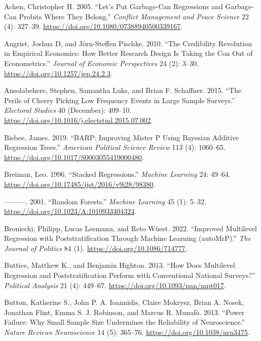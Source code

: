 \documentclass[
]{article}
\newlength{\cslhangindent}
\newlength{\cslentryspacingunit} %
\newenvironment{CSLReferences}[2] %
 {%
  \setlength{\parindent}{0pt}
  \ifodd #1
  \let\oldpar\par
  \def\par{\hangindent=\cslhangindent\oldpar}
  \fi
  \setlength{\parskip}{#2\cslentryspacingunit}
 }%
 {}
\begin{document}
\hypertarget{refs}{}
\begin{CSLReferences}{1}{0}
\leavevmode{}%
Achen, Christopher H. 2005. {``Let's Put Garbage-Can Regressions and
Garbage-Can Probits Where They Belong.''} \emph{Conflict Management and
Peace Science} 22 (4): 327--39.
\url{https://doi.org/10.1080/07388940500339167}.

\leavevmode{}%
Angrist, Joshua D, and Jörn-Steffen Pischke. 2010. {``The Credibility
Revolution in Empirical Economics: How Better Research Design Is Taking
the Con Out of Econometrics.''} \emph{Journal of Economic Perspectives}
24 (2): 3--30. \url{https://doi.org/10.1257/jep.24.2.3}.

\leavevmode{}%
Ansolabehere, Stephen, Samantha Luks, and Brian F. Schaffner. 2015.
{``The Perils of Cherry Picking Low Frequency Events in Large Sample
Surveys.''} \emph{Electoral Studies} 40 (December): 409--10.
\url{https://doi.org/10.1016/j.electstud.2015.07.002}.

\leavevmode{}%
Bisbee, James. 2019. {``BARP: Improving Mister P Using Bayesian Additive
Regression Trees.''} \emph{American Political Science Review} 113 (4):
1060--65. \url{https://doi.org/10.1017/S0003055419000480}.

\leavevmode{}%
Breiman, Leo. 1996. {``Stacked Regressions.''} \emph{Machine Learning}
24: 49--64. \url{https://doi.org/10.17485/ijst/2016/v9i28/98380}.

\leavevmode{}%
---------. 2001. {``Random Forests.''} \emph{Machine Learning} 45 (1):
5--32. \url{https://doi.org/10.1023/A:1010933404324}.

\leavevmode{}%
Broniecki, Philipp, Lucas Leemann, and Reto Wüest. 2022. {``Improved
Multilevel Regression with Poststratification Through Machine Learning
(autoMrP).''} \emph{The Journal of Politics} 84 (1).
\url{https://doi.org/10.1086/714777}.

\leavevmode{}%
Buttice, Matthew K., and Benjamin Highton. 2013. {``How Does Multilevel
Regression and Poststratification Perform with Conventional National
Surveys?''} \emph{Political Analysis} 21 (4): 449--67.
\url{https://doi.org/10.1093/pan/mpt017}.

\leavevmode{}%
Button, Katherine S., John P. A. Ioannidis, Claire Mokrysz, Brian A.
Nosek, Jonathan Flint, Emma S. J. Robinson, and Marcus R. Munafò. 2013.
{``Power Failure: Why Small Sample Size Undermines the Reliability of
Neuroscience.''} \emph{Nature Reviews Neuroscience} 14 (5): 365--76.
\url{https://doi.org/10.1038/nrn3475}.


\end{CSLReferences}
\end{document}
